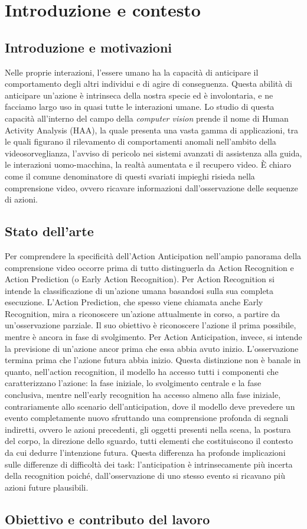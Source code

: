 \chapter{Introduzione e contesto}
\label{cap1}
\section{Introduzione e motivazioni}
Nelle proprie interazioni, l'essere umano ha la capacità di anticipare il comportamento degli altri individui e di agire di conseguenza. Questa abilità di anticipare un'azione è intrinseca della nostra specie ed è involontaria, e ne facciamo largo uso in quasi tutte le interazioni umane. Lo studio di questa capacità all'interno del campo della \textit{computer vision} prende il nome di Human Activity Analysis (HAA), la quale presenta una vasta gamma di applicazioni, tra le quali figurano il rilevamento di comportamenti anomali nell'ambito della videosorveglianza, l'avviso di pericolo nei sistemi avanzati di assistenza alla guida, le interazioni uomo-macchina, la realtà aumentata e il recupero video. È chiaro come il comune denominatore di questi svariati impieghi risieda nella comprensione video, ovvero ricavare informazioni dall'osservazione delle sequenze di azioni. 

\section{Stato dell'arte}
Per comprendere la specificità dell'Action Anticipation nell'ampio panorama della comprensione video occorre prima di tutto distinguerla da Action Recognition e Action Prediction (o Early Action Recognition). Per Action Recognition si intende la classificazione di un'azione umana basandosi sulla sua completa esecuzione.
L'Action Prediction, che spesso viene chiamata anche Early Recognition, mira a riconoscere un'azione attualmente in corso, a partire da un'osservazione parziale. Il suo obiettivo è riconoscere l'azione il prima possibile, mentre è ancora in fase di svolgimento. 
Per Action Anticipation, invece, si intende la previsione di un'azione ancor prima che essa abbia avuto inizio. L'osservazione termina prima che l'azione futura abbia inizio. Questa distinzione non è banale in quanto, nell'action recognition, il modello ha accesso tutti i componenti che caratterizzano l'azione: la fase iniziale, lo svolgimento centrale e la fase conclusiva, mentre nell'early recognition ha accesso almeno alla fase iniziale, contrariamente allo scenario dell'anticipation, dove il modello deve prevedere un evento completamente nuovo sfruttando una comprensione profonda di segnali indiretti, ovvero le azioni precedenti, gli oggetti presenti nella scena, la postura del corpo, la direzione dello sguardo, tutti elementi che costituiscono il contesto da cui dedurre l'intenzione futura. Questa differenza ha profonde implicazioni sulle differenze di difficoltà dei task: l'anticipation è intrinsecamente più incerta della recognition poiché, dall'osservazione di uno stesso evento si ricavano più azioni future plausibili. 

\section{Obiettivo e contributo del lavoro}
